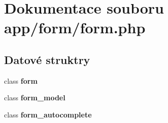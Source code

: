 \section{Dokumentace souboru app/form/form.php}
\label{d5/dc5/form_8php}
\subsection*{Datové struktry}
\begin{DoxyCompactItemize}
\item 
class {\bf form}
\item 
class {\bf form\_\-model}
\item 
class {\bf form\_\-autocomplete}
\end{DoxyCompactItemize}
